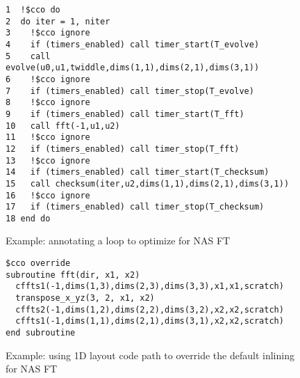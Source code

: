 \begin{figure}[h]
{\scriptsize
\begin{verbatim}
1  !$cco do
2  do iter = 1, niter
3    !$cco ignore
4    if (timers_enabled) call timer_start(T_evolve)
5    call evolve(u0,u1,twiddle,dims(1,1),dims(2,1),dims(3,1))
6    !$cco ignore
7    if (timers_enabled) call timer_stop(T_evolve)
8    !$cco ignore
9    if (timers_enabled) call timer_start(T_fft)
10   call fft(-1,u1,u2)
11   !$cco ignore
12   if (timers_enabled) call timer_stop(T_fft)
13   !$cco ignore
14   if (timers_enabled) call timer_start(T_checksum)
15   call checksum(iter,u2,dims(1,1),dims(2,1),dims(3,1))
16   !$cco ignore
17   if (timers_enabled) call timer_stop(T_checksum)
18 end do
\end{verbatim}
}
\caption{Example: annotating a loop to optimize for NAS FT}
\label{fig:code:ft}
\end{figure}

\begin{figure}[h]
{\scriptsize
\begin{verbatim}
$cco override
subroutine fft(dir, x1, x2)
  cffts1(-1,dims(1,3),dims(2,3),dims(3,3),x1,x1,scratch)
  transpose_x_yz(3, 2, x1, x2)
  cffts2(-1,dims(1,2),dims(2,2),dims(3,2),x2,x2,scratch)
  cffts1(-1,dims(1,1),dims(2,1),dims(3,1),x2,x2,scratch)
end subroutine
\end{verbatim}
}
\caption{Example: using 1D layout code path to override the default inlining for NAS FT}
\label{fig:annot:ft}
\end{figure}



